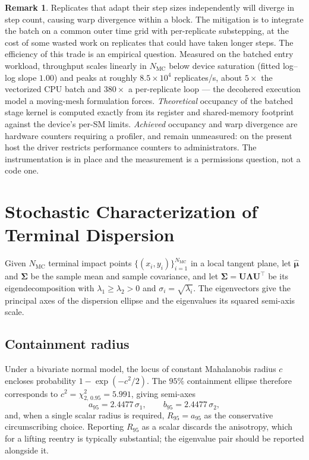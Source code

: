 \documentclass[11pt,a4paper]{article}
\theoremstyle{definition}
\newtheorem{remark}[theorem]{Remark}
\numberwithin{equation}{section}
\begin{document}
\begin{remark}
Replicates that adapt their step sizes independently will diverge in step count, causing warp divergence within a block. The mitigation is to integrate the batch on a common outer time grid with per-replicate substepping, at the cost of some wasted work on replicates that could have taken longer steps. The efficiency of this trade is an empirical question. Measured on the batched entry workload, throughput scales linearly in $N_{\text{MC}}$ below device saturation (fitted log--log slope $1.00$) and peaks at roughly $8.5\times10^{4}$ replicates/s, about $5\times$ the vectorized CPU batch and $380\times$ a per-replicate loop --- the decohered execution model a moving-mesh formulation forces. \emph{Theoretical} occupancy of the batched stage kernel is computed exactly from its register and shared-memory footprint against the device's per-SM limits. \emph{Achieved} occupancy and warp divergence are hardware counters requiring a profiler, and remain unmeasured: on the present host the driver restricts performance counters to administrators. The instrumentation is in place and the measurement is a permissions question, not a code one.
\end{remark}

\section{Stochastic Characterization of Terminal Dispersion}
\label{sec:stochastic}

Given $N_{\text{MC}}$ terminal impact points $\{(x_i, y_i)\}_{i=1}^{N_{\text{MC}}}$ in a local tangent plane, let $\hat{\bm{\mu}}$ and $\bm{\Sigma}$ be the sample mean and sample covariance, and let $\bm{\Sigma} = \mathbf{U}\bm{\Lambda}\mathbf{U}^{\!\top}$ be its eigendecomposition with $\lambda_1 \ge \lambda_2 > 0$ and $\sigma_i = \sqrt{\lambda_i}$. The eigenvectors give the principal axes of the dispersion ellipse and the eigenvalues its squared semi-axis scale.

\subsection{Containment radius}

Under a bivariate normal model, the locus of constant Mahalanobis radius $c$ encloses probability $1 - \exp(-c^2/2)$. The $95\%$ containment ellipse therefore corresponds to $c^2 = \chi^2_{2,\,0.95} = 5.991$, giving semi-axes
\begin{equation}
\label{eq:r95}
a_{95} = 2.4477\,\sigma_1, \qquad b_{95} = 2.4477\,\sigma_2 ,
\end{equation}
and, when a single scalar radius is required, $R_{95} = a_{95}$ as the conservative circumscribing choice. Reporting $R_{95}$ as a scalar discards the anisotropy, which for a lifting reentry is typically substantial; the eigenvalue pair should be reported alongside it.
\end{document}
